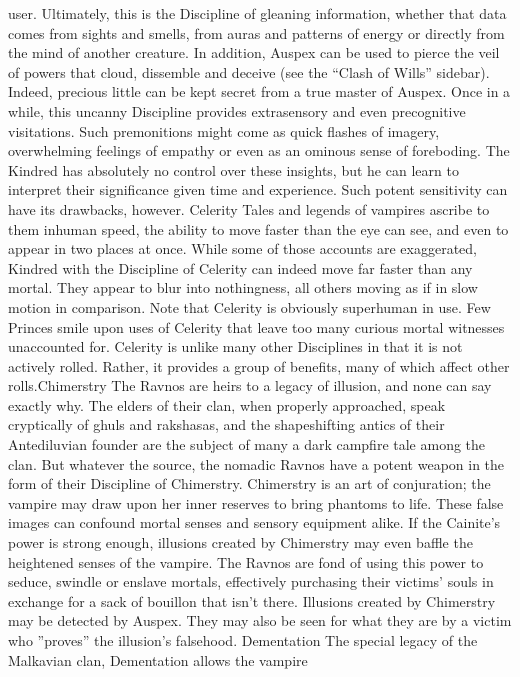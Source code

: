 \documentclass[10pt,a4paper]{article}
\begin{document}
user. Ultimately, this is the Discipline of gleaning information, whether that
data comes from sights and smells, from auras and patterns of energy or
directly from the mind of another creature. In addition, Auspex can be used
to pierce the veil of powers that cloud, dissemble and deceive (see the
“Clash of Wills” sidebar). Indeed, precious little can be kept secret from a
true master of Auspex. Once in a while, this uncanny Discipline provides
extrasensory and even precognitive visitations. Such premonitions might
come as quick flashes of imagery, overwhelming feelings of empathy or
even as an ominous sense of foreboding. The Kindred has absolutely no
control over these insights, but he can learn to interpret their significance
given time and experience. Such potent sensitivity can have its drawbacks,
however.
Celerity
Tales and legends of vampires ascribe to them inhuman speed, the ability to
move faster than the eye can see, and even to appear in two places at once.
While some of those accounts are exaggerated, Kindred with the Discipline
of Celerity can indeed move far faster than any mortal. They appear to blur
into nothingness, all others moving as if in slow motion in comparison.
Note that Celerity is obviously superhuman in use. Few Princes smile upon
uses of Celerity that leave too many curious mortal witnesses unaccounted
for.
Celerity is unlike many other Disciplines in that it is not actively rolled.
Rather, it provides a group of benefits, many of which affect other rolls.Chimerstry
The Ravnos are heirs to a legacy of illusion, and none can say exactly why.
The elders of their clan, when properly approached, speak cryptically of
ghuls and rakshasas, and the shapeshifting antics of their Antediluvian
founder are the subject of many a dark campfire tale among the clan. But
whatever the source, the nomadic Ravnos have a potent weapon in the form
of their Discipline of Chimerstry.
Chimerstry is an art of conjuration; the vampire may draw upon her inner
reserves to bring phantoms to life. These false images can confound mortal
senses and sensory equipment alike. If the Cainite's power is strong enough,
illusions created by Chimerstry may even baffle the heightened senses of
the vampire. The Ravnos are fond of using this power to seduce, swindle or
enslave mortals, effectively purchasing their victims' souls in exchange for a
sack of bouillon that isn't there.
Illusions created by Chimerstry may be detected by Auspex. They may also
be seen for what they are by a victim who ”proves” the illusion's falsehood.
Dementation
The special legacy of the Malkavian clan, Dementation allows the vampire
\end{document}
